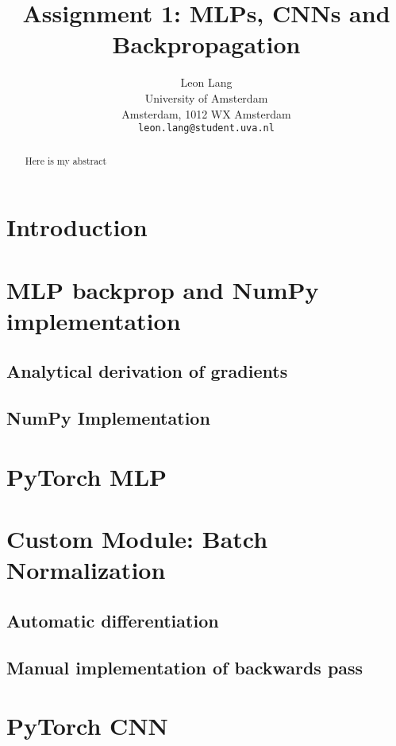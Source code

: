 \documentclass{article}
\title{Assignment 1: MLPs, CNNs and Backpropagation}
\author{%
  Leon Lang \\
  University of Amsterdam\\
  Amsterdam, 1012 WX Amsterdam \\
  \texttt{leon.lang@student.uva.nl}
}
\begin{document}

\maketitle

\begin{abstract}

Here is my abstract
\end{abstract}

\section{Introduction}

\cite{alexnet}

\section{MLP backprop and NumPy implementation}

\subsection{Analytical derivation of gradients}

\subsection{NumPy Implementation}

\section{PyTorch MLP}

\section{Custom Module: Batch Normalization}

\subsection{Automatic differentiation}

\subsection{Manual implementation of backwards pass}

\section{PyTorch CNN}
\end{document}
